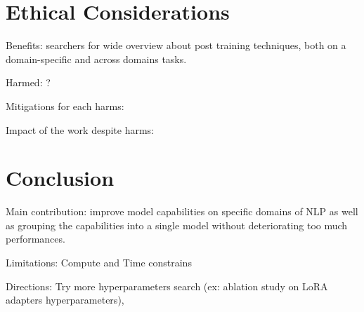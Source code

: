 \documentclass[11pt]{article}
\begin{document}
\section{Ethical Considerations}

Benefits: searchers for wide overview about post training techniques, both on a domain-specific and across domains tasks. 

Harmed: ?

Mitigations for each harms:

Impact of the work despite harms:

\section{Conclusion}

Main contribution: improve model capabilities on specific domains of NLP as well as grouping the capabilities into a single model without deteriorating too much performances. 

Limitations: Compute and Time constrains

Directions: Try more hyperparameters search (ex: ablation study on LoRA adapters hyperparameters), 

\end{document}
